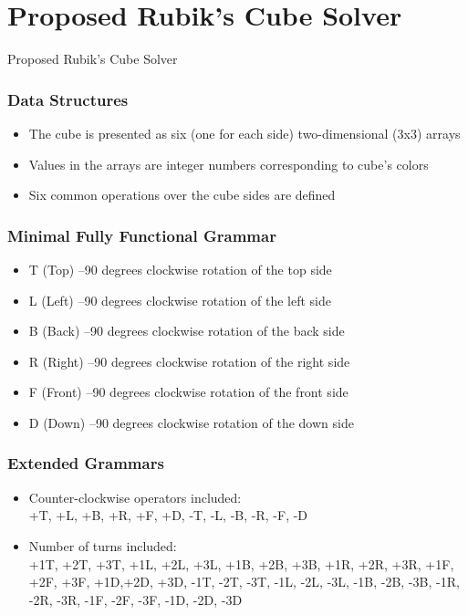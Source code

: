 \documentclass{beamer}
\begin{document}
\section{Proposed Rubik's Cube Solver}

\begin{frame}
\center \huge{Proposed Rubik's Cube Solver}
\end{frame}

\begin{frame}
\frametitle{Data Structures}
\begin{itemize}
  \item The cube is presented as six (one for each side) two-dimensional (3x3) arrays
  \item Values in the arrays are integer numbers corresponding to cube's colors
  \item Six common operations over the cube sides are defined
\end{itemize}
\end{frame}

\begin{frame}
\frametitle{Minimal Fully Functional Grammar}
\begin{itemize}
  \item T (Top) –90 degrees clockwise rotation of the top side
  \item L (Left) –90 degrees clockwise rotation of the left side
  \item B (Back) –90 degrees clockwise rotation of the back side
  \item R (Right) –90 degrees clockwise rotation of the right side
  \item F (Front) –90 degrees clockwise rotation of the front side
  \item D (Down) –90 degrees clockwise rotation of the down side
\end{itemize}
\end{frame}

\begin{frame}
\frametitle{Extended Grammars}
\begin{itemize}
  \item Counter-clockwise operators included: \\
  +T, +L, +B, +R, +F, +D, -T, -L, -B, -R, -F, -D
  \item Number of turns included: \\
  +1T, +2T, +3T, +1L, +2L, +3L, +1B, +2B, +3B, +1R, +2R, +3R, +1F, +2F, +3F, +1D,+2D, +3D, -1T, -2T, -3T, -1L, -2L, -3L, -1B, -2B, -3B, -1R, -2R, -3R, -1F, -2F, -3F, -1D, -2D, -3D
\end{itemize}
\end{frame}
\end{document}
